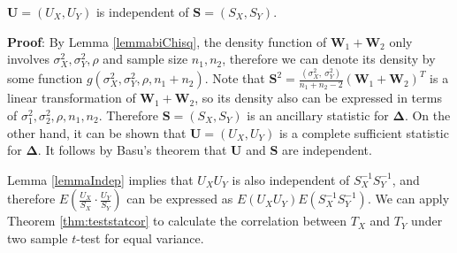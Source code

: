 	\begin{lemma}\label{lemmaIndep}
		$\bm U =(U_X, U_Y)$ is independent of $\bm S = (S_X ,S_Y)$.
	\end{lemma}
	\textbf{Proof}: By Lemma \ref{lemmabiChisq}, the density function of $
	\bm W_1 + \bm W_2$ only involves $\sigma^2_X, \sigma^2_Y, \rho$ and sample size $n_1, n_2$, 
	therefore
	we can denote its density by some function $g(\sigma^2_X, \sigma^2_Y, \rho,
	n_1 + n_2)$. Note that $\bm S^2 = \frac{(\sigma_X^2, ~\sigma^2_Y)}{n_1 +n_2 -2}(\bm W_1 + \bm 
	W_2)^T $
	is a linear transformation of $\bm W_1 + \bm W_2$, so its density also can be expressed in 
	terms of $\sigma^2_1, \sigma^2_2, \rho, n_1, n_2$. Therefore $\bm S = (S_X ,S_Y)$ is an 
	ancillary statistic for $\bm \Delta$. On the other hand, it can
	be shown that $\bm U =(U_X, U_Y)$ is a complete sufficient statistic for $\bm \Delta$. It 
	follows by
	Basu's theorem that $\bm U$ and $\bm S$ are independent. 
	
	
	Lemma \ref{lemmaIndep} implies that  $U_XU_Y$ is also independent of $S_X^{-1}S_Y^{-1}$, and
	therefore $E(\frac{U_X}{S_X} \cdot\frac{U_Y}{S_Y})$ can be expressed as
	$E(U_XU_Y)E(S_X^{-1}S_Y^{-1})$. We can apply Theorem \ref{thm:teststatcor} to calculate the 
	correlation between $T_X$ and $T_Y$ under two sample $t$-test for equal variance. 
	

